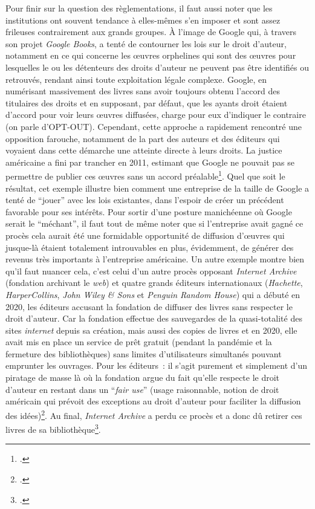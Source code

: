 Pour finir sur la question des règlementations, il faut aussi noter que les institutions ont souvent tendance à elles-mêmes s’en imposer et sont assez frileuses contrairement aux grands groupes. À l’image de Google qui, à travers son projet \textit{Google Books}, a tenté de contourner les lois sur le droit d’auteur, notamment en ce qui concerne les œuvres orphelines qui sont des œuvres pour lesquelles le ou les détenteurs des droits d’auteur ne peuvent pas être identifiés ou retrouvés, rendant ainsi toute exploitation légale complexe. Google, en numérisant massivement des livres sans avoir toujours obtenu l’accord des titulaires des droits et en supposant, par défaut, que les ayants droit étaient d’accord pour voir leurs œuvres diffusées, charge pour eux d’indiquer le contraire (on parle d’OPT-OUT). Cependant, cette approche a rapidement rencontré une opposition farouche, notamment de la part des auteurs et des éditeurs qui voyaient dans cette démarche une atteinte directe à leurs droits. La justice américaine a fini par trancher en 2011, estimant que Google ne pouvait pas se permettre de publier ces œuvres sans un accord préalable\footcite{ertzscheid2019}. Quel que soit le résultat, cet exemple illustre bien comment une entreprise de la taille de Google a tenté de \enquote{jouer} avec les lois existantes, dans l’espoir de créer un précédent favorable pour ses intérêts. Pour sortir d’une posture manichéenne où Google serait le \enquote{méchant}, il faut tout de même noter que si l’entreprise avait gagné ce procès cela aurait été une formidable opportunité de diffusion d’œuvres qui jusque-là étaient totalement introuvables en plus, évidemment, de générer des revenus très importants à l’entreprise américaine. Un autre exemple montre bien qu’il faut nuancer cela, c’est celui d’un autre procès opposant \textit{Internet Archive} (fondation archivant le \textit{web}) et quatre grands éditeurs internationaux (\textit{Hachette}, \textit{HarperCollins}, \textit{John Wiley \& Sons} et \textit{Penguin Random House}) qui a débuté en 2020, les éditeurs accusant la fondation de diffuser des livres sans respecter le droit d’auteur. Car la fondation effectue des sauvegardes de la quasi-totalité des sites \textit{internet} depuis sa création, mais aussi des copies de livres et en 2020, elle avait mis en place un service de prêt gratuit (pendant la pandémie et la fermeture des bibliothèques) sans limites d’utilisateurs simultanés pouvant emprunter les ouvrages. Pour les éditeurs : il s’agit purement et simplement d’un piratage de masse là où la fondation argue du fait qu’elle respecte le droit d’auteur en restant dans un \enquote{\textit{fair use}} (usage raisonnable, notion de droit américain qui prévoit des exceptions au droit d’auteur pour faciliter la diffusion des idées)\footcite{noauthor_aux_2023}. Au final, \textit{Internet Archive} a perdu ce procès et a donc dû retirer ces livres de sa bibliothèque\footcite{noauthor_condamnee_nodate}.

